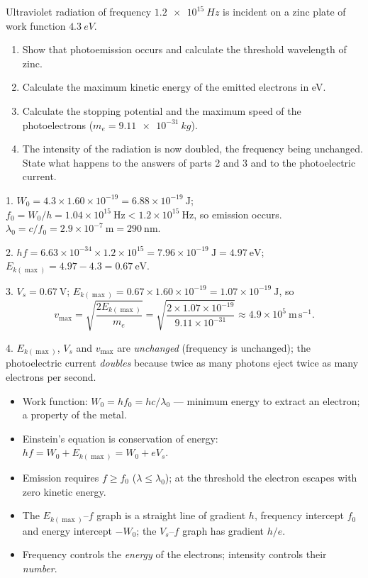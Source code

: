 \documentclass[11pt]{article}
\begin{document}
\begin{exercice}
Ultraviolet radiation of frequency $\SI{1.2e15}{Hz}$ is incident on a zinc plate of work function $\SI{4.3}{eV}$.
\begin{enumerate}
\item Show that photoemission occurs and calculate the threshold wavelength of zinc.
\item Calculate the maximum kinetic energy of the emitted electrons in eV.
\item Calculate the stopping potential and the maximum speed of the photoelectrons ($m_e = \SI{9.11e-31}{kg}$).
\item The intensity of the radiation is now doubled, the frequency being unchanged. State what happens to the answers of parts 2 and 3 and to the photoelectric current.
\end{enumerate}
\end{exercice}

\begin{corrige}[Exercise 1]
1. $W_0 = 4.3\times 1.60\times 10^{-19} = 6.88\times 10^{-19}\ \mathrm{J}$; $f_0 = W_0/h = 1.04\times 10^{15}\ \mathrm{Hz} < 1.2\times 10^{15}\ \mathrm{Hz}$, so emission occurs. $\lambda_0 = c/f_0 = 2.9\times 10^{-7}\ \mathrm{m} = 290\ \mathrm{nm}$.

2. $hf = 6.63\times 10^{-34}\times 1.2\times 10^{15} = 7.96\times 10^{-19}\ \mathrm{J} = 4.97\ \mathrm{eV}$; $E_{k(\max)} = 4.97 - 4.3 = 0.67\ \mathrm{eV}$.

3. $V_s = 0.67\ \mathrm{V}$; $E_{k(\max)} = 0.67\times 1.60\times 10^{-19} = 1.07\times 10^{-19}\ \mathrm{J}$, so
\[
v_{\max} = \sqrt{\frac{2E_{k(\max)}}{m_e}} = \sqrt{\frac{2\times 1.07\times 10^{-19}}{9.11\times 10^{-31}}} \approx 4.9\times 10^{5}\ \mathrm{m\,s^{-1}}.
\]

4. $E_{k(\max)}$, $V_s$ and $v_{\max}$ are \emph{unchanged} (frequency is unchanged); the photoelectric current \emph{doubles} because twice as many photons eject twice as many electrons per second.
\end{corrige}

\begin{aretenir}
\begin{itemize}
\item Work function: $W_0 = hf_0 = hc/\lambda_0$ --- minimum energy to extract an electron; a property of the metal.
\item Einstein's equation is conservation of energy: $hf = W_0 + E_{k(\max)} = W_0 + eV_s$.
\item Emission requires $f \geq f_0$ ($\lambda \leq \lambda_0$); at the threshold the electron escapes with zero kinetic energy.
\item The $E_{k(\max)}$--$f$ graph is a straight line of gradient $h$, frequency intercept $f_0$ and energy intercept $-W_0$; the $V_s$--$f$ graph has gradient $h/e$.
\item Frequency controls the \emph{energy} of the electrons; intensity controls their \emph{number}.
\end{itemize}
\end{aretenir}
\end{document}
